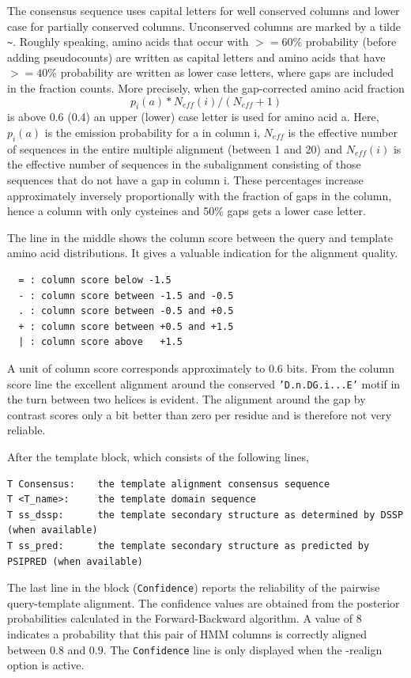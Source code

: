 \documentclass[11pt,a4paper]{article}
\begin{document}
The consensus sequence uses capital letters for well conserved columns and
lower case for partially conserved columns. Unconserved columns are marked by 
a tilde \verb`~`. Roughly speaking, amino acids that occur with $>=60\%$ probability 
(before adding pseudocounts) are written as capital letters and amino acids that have 
$>=40\%$ probability are written as lower case letters, where gaps are included
in the fraction counts. More precisely, when the gap-corrected amino acid fraction
    \[p_i(a)*N_{eff}(i)/(N_{eff}+1)\]
is above 0.6 (0.4) an upper (lower) case letter is used for amino acid a.
Here, $p_i(a)$ is the emission probability for a in column i, $N_{eff}$ is the effective 
number of sequences in the entire multiple alignment (between 1 and 20) and $N_{eff}(i)$ is 
the effective number of sequences in the subalignment consisting of those sequences
that do not have a gap in column i. These percentages increase
approximately inversely proportionally with the fraction of gaps in the column, 
hence a column with only cysteines and 50\% gaps gets a lower case letter.
              
The line in the middle shows the column score between the query and template 
amino acid distributions. It gives a valuable indication for the alignment quality.
\small
\begin{verbatim}
  = : column score below -1.5
  - : column score between -1.5 and -0.5
  . : column score between -0.5 and +0.5
  + : column score between +0.5 and +1.5
  | : column score above   +1.5
\end{verbatim}\normalsize

A unit of column score corresponds approximately to 0.6 bits.
From the column score line the excellent alignment around the conserved 
{\tt 'D.n.DG.i...E'} motif in the turn between two helices is evident. The alignment around the 
gap by contrast scores only a bit better than zero per residue and is
therefore not very reliable.

After the template block, which consists of the following lines, 
\small 
\begin{verbatim}
T Consensus:    the template alignment consensus sequence
T <T_name>:     the template domain sequence
T ss_dssp:      the template secondary structure as determined by DSSP (when available)
T ss_pred:      the template secondary structure as predicted by PSIPRED (when available)
\end{verbatim}\normalsize

The last line in the block ({\tt Confidence}) reports the reliability of the pairwise 
query-template alignment. The confidence values are obtained from the posterior 
probabilities calculated in the Forward-Backward algorithm. A value of 8 indicates
a probability that this pair of HMM columns is correctly aligned between 0.8 and 0.9. 
The {\tt Confidence} line is only displayed when the -realign option is active.
\end{document}

